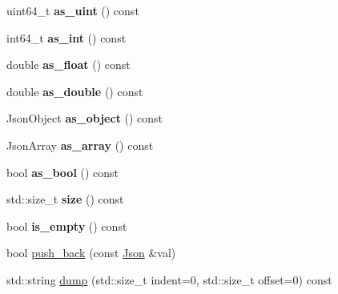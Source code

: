 \begin{DoxyCompactItemize}
\item 
\mbox{\label{classnta_1_1utils_1_1Json_ae8e43e1645fa2ba2e26c56f3a9f5938d}} 
uint64\+\_\+t {\bfseries as\+\_\+uint} () const
\item 
\mbox{\label{classnta_1_1utils_1_1Json_a81ab98ec58659a3c722c165b2f2cad26}} 
int64\+\_\+t {\bfseries as\+\_\+int} () const
\item 
\mbox{\label{classnta_1_1utils_1_1Json_ad0654a2845c1957e9e26e0d349190aae}} 
double {\bfseries as\+\_\+float} () const
\item 
\mbox{\label{classnta_1_1utils_1_1Json_af99b16247ed73aceacea08b1b5a9c08d}} 
double {\bfseries as\+\_\+double} () const
\item 
\mbox{\label{classnta_1_1utils_1_1Json_a9ff2984098105b164e0110684cd6d4f1}} 
Json\+Object {\bfseries as\+\_\+object} () const
\item 
\mbox{\label{classnta_1_1utils_1_1Json_ab42df34419fb892f2210527f01a82154}} 
Json\+Array {\bfseries as\+\_\+array} () const
\item 
\mbox{\label{classnta_1_1utils_1_1Json_ad6d8da49cb8355c956ab75faa79cad2c}} 
bool {\bfseries as\+\_\+bool} () const
\item 
\mbox{\label{classnta_1_1utils_1_1Json_a2f3d19984b11f942d0725f76e8e9a165}} 
std\+::size\+\_\+t {\bfseries size} () const
\item 
\mbox{\label{classnta_1_1utils_1_1Json_af306c2488e1a4ea456b37dc2dc1205f1}} 
bool {\bfseries is\+\_\+empty} () const
\item 
bool \hyperlink{classnta_1_1utils_1_1Json_a2015e471fd47c1a077ca752c9b1fabbd}{push\+\_\+back} (const \hyperlink{classnta_1_1utils_1_1Json}{Json} \&val)
\item 
std\+::string \hyperlink{classnta_1_1utils_1_1Json_ab0e60f7a55d12aab005d420c8f924035}{dump} (std\+::size\+\_\+t indent=0, std\+::size\+\_\+t offset=0) const
\item 

\end{DoxyCompactItemize}
